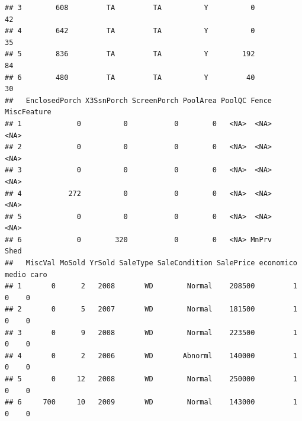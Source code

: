 \documentclass[
]{article}
\begin{document}
\begin{verbatim}
## 3        608         TA         TA          Y          0          42
## 4        642         TA         TA          Y          0          35
## 5        836         TA         TA          Y        192          84
## 6        480         TA         TA          Y         40          30
##   EnclosedPorch X3SsnPorch ScreenPorch PoolArea PoolQC Fence MiscFeature
## 1             0          0           0        0   <NA>  <NA>        <NA>
## 2             0          0           0        0   <NA>  <NA>        <NA>
## 3             0          0           0        0   <NA>  <NA>        <NA>
## 4           272          0           0        0   <NA>  <NA>        <NA>
## 5             0          0           0        0   <NA>  <NA>        <NA>
## 6             0        320           0        0   <NA> MnPrv        Shed
##   MiscVal MoSold YrSold SaleType SaleCondition SalePrice economico medio caro
## 1       0      2   2008       WD        Normal    208500         1     0    0
## 2       0      5   2007       WD        Normal    181500         1     0    0
## 3       0      9   2008       WD        Normal    223500         1     0    0
## 4       0      2   2006       WD       Abnorml    140000         1     0    0
## 5       0     12   2008       WD        Normal    250000         1     0    0
## 6     700     10   2009       WD        Normal    143000         1     0    0
\end{verbatim}
\end{document}
